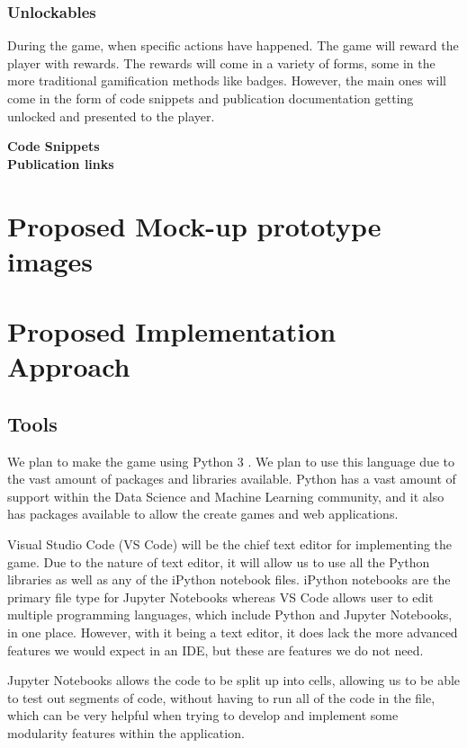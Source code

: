 \documentclass[a4paper,10pt]{article}
\begin{document}
\subsubsection{Unlockables}
During the game, when specific actions have happened. The game will reward the player with rewards. The rewards will come in a variety of forms, some in the more traditional gamification methods like badges. However, the main ones will come in the form of code snippets and publication documentation getting unlocked and presented to the player. 

\textbf{Code Snippets}\\
\textbf{Publication links}\\

\section{Proposed Mock-up prototype images}


\section{Proposed Implementation Approach}
\subsection{Tools}
We plan to make the game using Python 3 \cite{reference here}. We plan to use this language due to the vast amount of packages and libraries available. Python has a vast amount of support within the Data Science and Machine Learning community, and it also has packages available to allow the create games and web applications. 

Visual Studio Code (VS Code) will be the chief text editor for implementing the game. Due to the nature of text editor, it will allow us to use all the Python libraries as well as any of the iPython notebook files. iPython notebooks are the primary file type for Jupyter Notebooks whereas VS Code allows user to edit multiple programming languages, which include Python and Jupyter Notebooks, in one place. However, with it being a text editor, it does lack the more advanced features we would expect in an IDE, but these are features we do not need.  

Jupyter Notebooks allows the code to be split up into cells, allowing us to be able to test out segments of code, without having to run all of the code in the file, which can be very helpful when trying to develop and implement some modularity features within the application.
\end{document}
